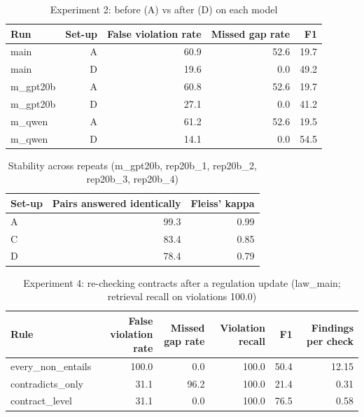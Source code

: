 \begin{table}[t]
\centering
\caption{Experiment 2: before (A) vs after (D) on each model}
\begin{tabular}{lrrrr}
\toprule
Run & Set-up & False violation rate & Missed gap rate & F1 \\
\midrule
main & A & 60.9 & 52.6 & 19.7 \\
main & D & 19.6 & 0.0 & 49.2 \\
m\_gpt20b & A & 60.8 & 52.6 & 19.7 \\
m\_gpt20b & D & 27.1 & 0.0 & 41.2 \\
m\_qwen & A & 61.2 & 52.6 & 19.5 \\
m\_qwen & D & 14.1 & 0.0 & 54.5 \\
\bottomrule
\end{tabular}
\end{table}

\begin{table}[t]
\centering
\caption{Stability across repeats (m_gpt20b, rep20b_1, rep20b_2, rep20b_3, rep20b_4)}
\begin{tabular}{lrr}
\toprule
Set-up & Pairs answered identically & Fleiss' kappa \\
\midrule
A & 99.3 & 0.99 \\
C & 83.4 & 0.85 \\
D & 78.4 & 0.79 \\
\bottomrule
\end{tabular}
\end{table}

\begin{table}[t]
\centering
\caption{Experiment 4: re-checking contracts after a regulation update (law_main; retrieval recall on violations 100.0)}
\begin{tabular}{lrrrrr}
\toprule
Rule & False violation rate & Missed gap rate & Violation recall & F1 & Findings per check \\
\midrule
every\_non\_entails & 100.0 & 0.0 & 100.0 & 50.4 & 12.15 \\
contradicts\_only & 31.1 & 96.2 & 100.0 & 21.4 & 0.31 \\
contract\_level & 31.1 & 0.0 & 100.0 & 76.5 & 0.58 \\
\bottomrule
\end{tabular}
\end{table}
